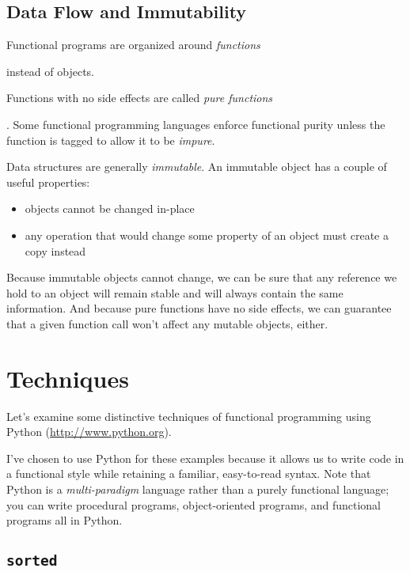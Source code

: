 \documentclass[ignorenonframetext,red]{beamer}
\begin{document}
\subsection{Data Flow and Immutability}
\begin{frame}
Functional programs are organized around \textit{functions}
\end{frame}%
instead of objects.
\begin{frame}%
Functions with no side effects are called \textit{pure functions}%
\end{frame}.
Some functional programming languages enforce functional purity unless the function is tagged to allow it to be \textit{impure}.
\begin{frame}%
Data structures are generally \textit{immutable}. An immutable object has a couple of useful properties:
\begin{itemize}
\pause \item objects cannot be changed in-place
\pause \item any operation that would change some property of an object must create a copy instead
\end{itemize}
\end{frame}
\noindent Because immutable objects cannot change, we can be sure that any reference we hold to an object will remain stable and will always contain the same information. And because pure functions have no side effects, we can guarantee that a given function call won't affect any mutable objects, either.

\section{Techniques}
\begin{frame}
Let's examine some distinctive techniques of functional programming using Python (\url{http://www.python.org}).
\end{frame}%
I've chosen to use Python for these examples because it allows us to write code in a functional style while retaining a familiar, easy-to-read syntax. Note that Python is a \textit{multi-paradigm} language rather than a purely functional language; you can write procedural programs, object-oriented programs, and functional programs all in Python.

\subsection{\tt sorted}
\end{document}
